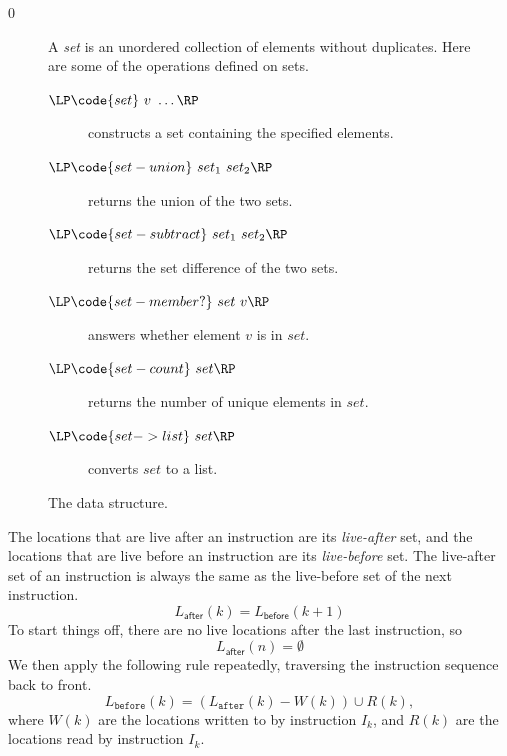 \documentclass[7x10]{TimesAPriori_MIT}%
\def\racketEd{0}
\def\edition{1}
\numberwithin{theorem}{chapter}
\numberwithin{definition}{chapter}
\numberwithin{equation}{chapter}
\begin{document}
{\if\edition\racketEd
\begin{figure}[tp]
  \small
  \begin{tcolorbox}[title=\href{https://docs.racket-lang.org/reference/sets.html}{The Racket Set Package}]
    A \emph{set} is an unordered collection of elements without duplicates.
    Here are some of the operations defined on sets.
  \begin{description}
  \item[$\LP\code{set}~v~\ldots\RP$] constructs a set containing the specified elements.
  \item[$\LP\code{set-union}~set_1~set_2\RP$] returns the union of the two sets.
  \item[$\LP\code{set-subtract}~set_1~set_2\RP$] returns the set
    difference of the two sets.
  \item[$\LP\code{set-member?}~set~v\RP$] answers whether element $v$ is in $set$.
  \item[$\LP\code{set-count}~set\RP$] returns the number of unique elements in $set$.
  \item[$\LP\code{set->list}~set\RP$] converts $set$ to a list.
  \end{description}
  \end{tcolorbox}
  \caption{The  data structure.}
  \label{fig:set}
\end{figure}
\fi}

The locations that are live after an instruction are its
\emph{live-after} set, and the locations
that are live before an instruction are its
\emph{live-before} set. The live-after
set of an instruction is always the same as the live-before set of the
next instruction.
\begin{equation} \label{eq:live-after-before-next}
  L_{\mathsf{after}}(k) = L_{\mathsf{before}}(k+1)
\end{equation}
To start things off, there are no live locations after the last
instruction, so
\begin{equation}\label{eq:live-last-empty}
  L_{\mathsf{after}}(n) = \emptyset
\end{equation}
We then apply the following rule repeatedly, traversing the
instruction sequence back to front.
\begin{equation}\label{eq:live-before-after-minus-writes-plus-reads}
  L_{\mathtt{before}}(k) = (L_{\mathtt{after}}(k) - W(k)) \cup R(k),
\end{equation}
where $W(k)$ are the locations written to by instruction $I_k$, and
$R(k)$ are the locations read by instruction $I_k$.
\end{document}
